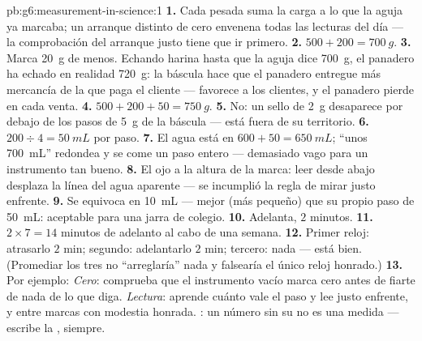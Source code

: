 \begin{solution}{pb:g6:measurement-in-science:1}
\textbf{1.} Cada pesada suma la carga a lo que la aguja ya marcaba;
un arranque distinto de cero envenena todas las lecturas del día ---
la comprobación del arranque justo tiene que ir primero.
\textbf{2.} $500 + 200 = \qty{700}{g}$.
\textbf{3.} Marca \qty{20}{g} de menos. Echando harina hasta que la
aguja dice \qty{700}{g}, el panadero ha echado en realidad
\qty{720}{g}: la báscula hace que el panadero entregue más mercancía
de la que paga el cliente --- favorece a los clientes, y el panadero
pierde en cada venta.
\textbf{4.} $500 + 200 + 50 = \qty{750}{g}$.
\textbf{5.} No: un sello de \qty{2}{g} desaparece por debajo de los
pasos de \qty{5}{g} de la báscula --- está fuera de su territorio.
\textbf{6.} $200 \div 4 = \qty{50}{mL}$ por paso.
\textbf{7.} El agua está en $600 + 50 = \qty{650}{mL}$; ``unos
\qty{700}{mL}'' redondea y se come un paso entero --- demasiado vago
para un instrumento tan bueno.
\textbf{8.} El ojo a la altura de la marca: leer desde abajo desplaza
la línea del agua aparente --- se incumplió la regla de mirar justo
enfrente.
\textbf{9.} Se equivoca en \qty{10}{mL} --- mejor (más pequeño) que su
propio paso de \qty{50}{mL}: aceptable para una jarra de colegio.
\textbf{10.} Adelanta, $2$ minutos.
\textbf{11.} $2 \times 7 = 14$ minutos de adelanto al cabo de una
semana.
\textbf{12.} Primer reloj: atrasarlo $2$ min; segundo: adelantarlo
$2$ min; tercero: nada --- está bien. (Promediar los tres no
``arreglaría'' nada y falsearía el único reloj honrado.)
\textbf{13.} Por ejemplo: \emph{Cero}: comprueba que el instrumento
vacío marca cero antes de fiarte de nada de lo que diga.
\emph{Lectura}: aprende cuánto vale el paso y lee justo enfrente, y
entre marcas con modestia honrada. \emph{}: un número sin
su  no es una medida --- escribe la , siempre.
\end{solution}
